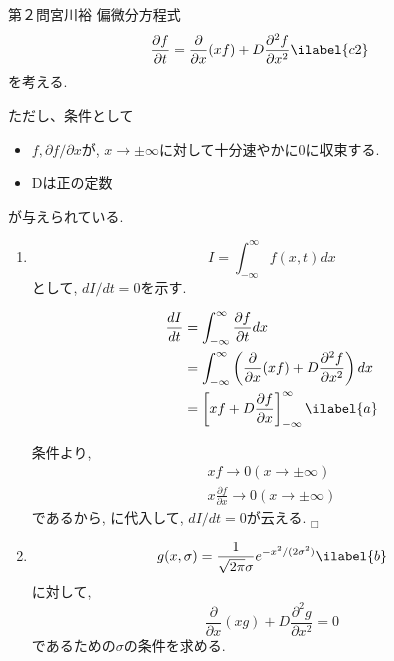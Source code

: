 \documentclass[fleqn]{jbook}
\begin{document}
\begin{answer}{第２問}{宮川裕}
偏微分方程式
\begin{equation}
  \frac{\partial f}{\partial t} = \frac{\partial}{\partial x} (xf) + D \frac{\partial ^2 f}{\partial x^2} \ilabel{c2}
\end{equation}
を考える.

ただし、条件として
\begin{itemize}
\item{$f,\partial f/\partial x$が, $x \rightarrow \pm \infty$に対して十分速やかに$0$に収束する. }
\item{Dは正の定数}
\end{itemize}
が与えられている.

\begin{enumerate}
\item
  \begin{equation}
  I=\int^\infty_{-\infty}f(x,t)dx
  \end{equation}
  として, $dI/dt=0$を示す. 

  \begin{align}
    \frac{dI}{dt} &= \int^\infty_{-\infty} \frac{\partial f}{\partial t}dx \notag \\
      &= \int^\infty_{-\infty} \left( \frac{\partial}{\partial x} (xf) + D \frac{\partial ^2 f}{\partial x^2} \right) dx \notag \\
      &= \left[ xf + D \frac{\partial f}{\partial x} \right]^\infty_{-\infty} \ilabel{a}
  \end{align}

  条件より, 
  \begin{gather}
    xf \rightarrow 0 ( x \rightarrow \pm \infty ) \\
    x \frac{\partial f}{\partial x} \rightarrow 0 ( x \rightarrow \pm \infty ) 
  \end{gather}
  であるから, に代入して, $dI/dt=0$が云える. $_\Box$

\item{}
  \begin{equation}
    g(x,\sigma)=\frac{1}{\sqrt{2\pi} \sigma} e^{-x^2/(2\sigma^2)} \ilabel{b}
  \end{equation}
  に対して, 
  \begin{equation}
    \frac{\partial}{\partial x} (xg) + D \frac{\partial ^2 g}{\partial x^2} =0
  \end{equation}
  であるための$\sigma$の条件を求める. 


\end{enumerate}
\end{answer}
\end{document}
